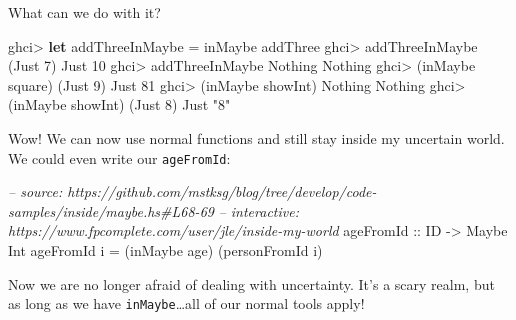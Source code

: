 \documentclass[]{article}
\newenvironment{Shaded}{}{}
\newcommand{\KeywordTok}[1]{\textcolor[rgb]{0.00,0.44,0.13}{\textbf{{#1}}}}
\newcommand{\DataTypeTok}[1]{\textcolor[rgb]{0.56,0.13,0.00}{{#1}}}
\newcommand{\DecValTok}[1]{\textcolor[rgb]{0.25,0.63,0.44}{{#1}}}
\newcommand{\StringTok}[1]{\textcolor[rgb]{0.25,0.44,0.63}{{#1}}}
\newcommand{\CommentTok}[1]{\textcolor[rgb]{0.38,0.63,0.69}{\textit{{#1}}}}
\newcommand{\OtherTok}[1]{\textcolor[rgb]{0.00,0.44,0.13}{{#1}}}
\newcommand{\FunctionTok}[1]{\textcolor[rgb]{0.02,0.16,0.49}{{#1}}}
\newcommand{\NormalTok}[1]{{#1}}
\begin{document}
What can we do with it?

\begin{Shaded}
\begin{Highlighting}[]
\NormalTok{ghci}\FunctionTok{>} \KeywordTok{let} \NormalTok{addThreeInMaybe }\FunctionTok{=} \NormalTok{inMaybe addThree}
\NormalTok{ghci}\FunctionTok{>} \NormalTok{addThreeInMaybe (}\DataTypeTok{Just} \DecValTok{7}\NormalTok{)}
\DataTypeTok{Just} \DecValTok{10}
\NormalTok{ghci}\FunctionTok{>} \NormalTok{addThreeInMaybe }\DataTypeTok{Nothing}
\DataTypeTok{Nothing}
\NormalTok{ghci}\FunctionTok{>} \NormalTok{(inMaybe square) (}\DataTypeTok{Just} \DecValTok{9}\NormalTok{)}
\DataTypeTok{Just} \DecValTok{81}
\NormalTok{ghci}\FunctionTok{>} \NormalTok{(inMaybe showInt) }\DataTypeTok{Nothing}
\DataTypeTok{Nothing}
\NormalTok{ghci}\FunctionTok{>} \NormalTok{(inMaybe showInt) (}\DataTypeTok{Just} \DecValTok{8}\NormalTok{)}
\DataTypeTok{Just} \StringTok{"8"}
\end{Highlighting}
\end{Shaded}

Wow! We can now use normal functions and still stay inside my uncertain world. We could even write
our \texttt{ageFromId}:

\begin{Shaded}
\begin{Highlighting}[]
\CommentTok{-- source: https://github.com/mstksg/blog/tree/develop/code-samples/inside/maybe.hs#L68-69}
\CommentTok{-- interactive: https://www.fpcomplete.com/user/jle/inside-my-world}
\OtherTok{ageFromId ::} \DataTypeTok{ID} \OtherTok{->} \DataTypeTok{Maybe} \DataTypeTok{Int}
\NormalTok{ageFromId i }\FunctionTok{=} \NormalTok{(inMaybe age) (personFromId i)}
\end{Highlighting}
\end{Shaded}

Now we are no longer afraid of dealing with uncertainty. It's a scary realm, but as long as we have
\texttt{inMaybe}\ldots{}all of our normal tools apply!
\end{document}
